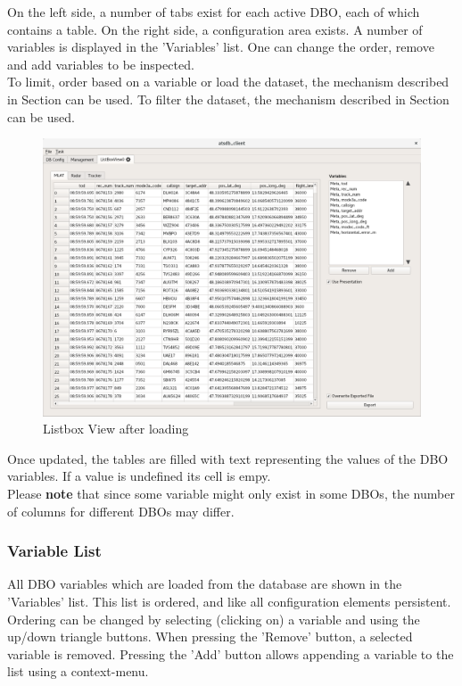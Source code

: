 \documentclass[10pt,letterpaper,extrafontsizes]{memoir}
\begin{document}
On the left side, a number of tabs exist for each active DBO, each of which contains a table. On the right side, a configuration area exists. A number of variables is displayed in the 'Variables' list. One can change the order, remove and add variables to be inspected. \\

To limit, order based on a variable or load the dataset, the mechanism described in Section  can be used. To filter the dataset, the mechanism described in Section  can be used.

\begin{figure}[H]
    \hspace*{-2cm}
    \includegraphics[width=18cm,frame]{../screenshots/listbox_loaded.png}
  \caption{Listbox View after loading}
  \label{fig:listbox_load}
\end{figure}

Once updated, the tables are filled with text representing the values of the DBO variables.  If a value is undefined its cell is empy. \\

Please \textbf{note} that since some variable might only exist in some DBOs, the number of columns for different DBOs may differ.

\subsubsection{Variable List}
All DBO variables which are loaded from the database are shown in the 'Variables' list. This list is ordered,
and like all configuration elements persistent. Ordering can be changed by selecting (clicking on) a variable
and using the up/down triangle buttons.
When pressing the 'Remove' button, a selected variable is removed.  Pressing the 'Add' button allows
appending a variable to the list using a context-menu.
\end{document}
